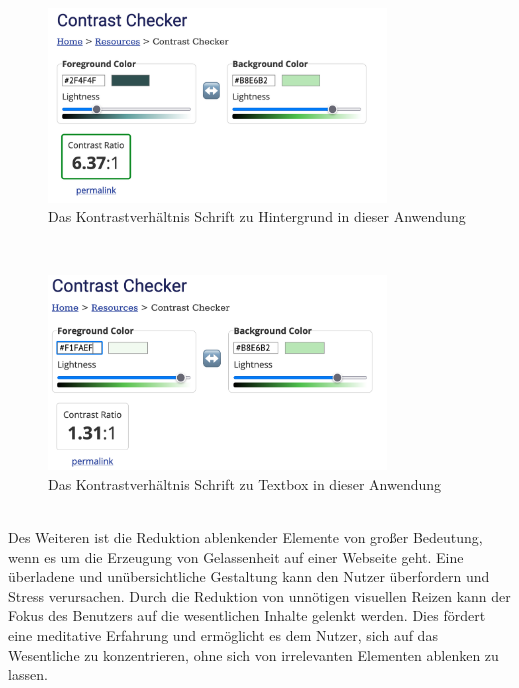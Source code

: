 \documentclass[./dokumentation.tex]{subfiles}
\begin{document}
\begin{figure}[h]
    \centering
    \includegraphics[width=0.8\textwidth]{bilder/contrast-gelassenheit.png}
    \caption{Das Kontrastverhältnis Schrift zu Hintergrund in dieser Anwendung}
    \label{fig21:contrast}
\end{figure}\\

\begin{figure}[h]
    \centering
    \includegraphics[width=0.8\textwidth]{bilder/contrast-box.png}
    \caption{Das Kontrastverhältnis Schrift zu Textbox in dieser Anwendung}
    \label{fig23:contrast}
\end{figure}\\

Des Weiteren ist die Reduktion ablenkender Elemente von großer Bedeutung, wenn es um die Erzeugung von Gelassenheit auf einer Webseite geht. Eine überladene und unübersichtliche Gestaltung kann den Nutzer überfordern und Stress verursachen. Durch die Reduktion von unnötigen visuellen Reizen kann der Fokus des Benutzers auf die wesentlichen Inhalte gelenkt werden. Dies fördert eine meditative Erfahrung und ermöglicht es dem Nutzer, sich auf das Wesentliche zu konzentrieren, ohne sich von irrelevanten Elementen ablenken zu lassen.\\
\end{document}
